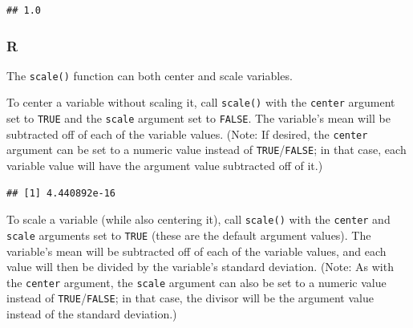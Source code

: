 \documentclass[
]{book}
\newenvironment{Shaded}{\begin{snugshade}}{\end{snugshade}}
\newcommand{\AttributeTok}[1]{\textcolor[rgb]{0.77,0.63,0.00}{#1}}
\newcommand{\FunctionTok}[1]{\textcolor[rgb]{0.00,0.00,0.00}{#1}}
\newcommand{\NormalTok}[1]{#1}
\newcommand{\OtherTok}[1]{\textcolor[rgb]{0.56,0.35,0.01}{#1}}
\newcommand{\SpecialCharTok}[1]{\textcolor[rgb]{0.00,0.00,0.00}{#1}}
\begin{document}
\begin{verbatim}
## 1.0
\end{verbatim}

\hypertarget{r-40}{%
\subsubsection*{R}\label{r-40}}

The \texttt{scale()} function can both center and scale variables.

To center a variable without scaling it, call \texttt{scale()} with the \texttt{center} argument set to \texttt{TRUE} and the \texttt{scale} argument set to \texttt{FALSE}. The variable's mean will be subtracted off of each of the variable values. (Note: If desired, the \texttt{center} argument can be set to a numeric value instead of \texttt{TRUE}/\texttt{FALSE}; in that case, each variable value will have the argument value subtracted off of it.)

\begin{Shaded}
\end{Shaded}

\begin{verbatim}
## [1] 4.440892e-16
\end{verbatim}

To scale a variable (while also centering it), call \texttt{scale()} with the \texttt{center} and \texttt{scale} arguments set to \texttt{TRUE} (these are the default argument values). The variable's mean will be subtracted off of each of the variable values, and each value will then be divided by the variable's standard deviation. (Note: As with the \texttt{center} argument, the \texttt{scale} argument can also be set to a numeric value instead of \texttt{TRUE}/\texttt{FALSE}; in that case, the divisor will be the argument value instead of the standard deviation.)

\begin{Shaded}
\end{Shaded}
\end{document}
